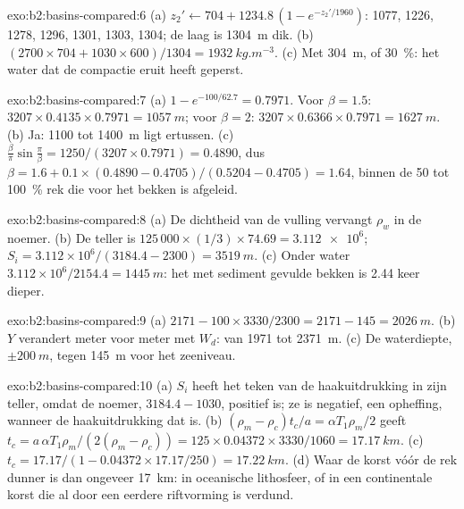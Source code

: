 \begin{solution}{exo:b2:basins-compared:6}
(a) $z_2' \leftarrow 704 + 1234.8\,(1 - e^{-z_2'/1960})$: 1077, 1226, 1278, 1296, 1301, 1303,
1304; de laag is \qty{1304}{m} dik. (b) $(2700\times704 + 1030\times600)/1304 =
\qty{1932}{kg.m^{-3}}$. (c) Met \qty{304}{m}, of \qty{30}{\percent}: het water dat de compactie
eruit heeft geperst.
\end{solution}

\begin{solution}{exo:b2:basins-compared:7}
(a) $1 - e^{-100/62.7} = 0.7971$. Voor $\beta = 1.5$: $3207\times0.4135\times0.7971 =
\qty{1057}{m}$; voor $\beta = 2$: $3207\times0.6366\times0.7971 = \qty{1627}{m}$. (b) Ja: 1100 tot
\qty{1400}{m} ligt ertussen. (c) $\frac{\beta}{\pi}\sin\frac{\pi}{\beta} = 1250/(3207\times0.7971)
= 0.4890$, dus $\beta = 1.6 + 0.1\times(0.4890 - 0.4705)/(0.5204 - 0.4705) = 1.64$, binnen de
50 tot \qty{100}{\percent} rek die voor het bekken is afgeleid.
\end{solution}

\begin{solution}{exo:b2:basins-compared:8}
(a) De dichtheid van de vulling vervangt $\rho_w$ in de noemer. (b) De teller is
$125\,000\times(1/3)\times74.69 = \num{3.112e6}$; $S_i = 3.112\times10^{6}/(3184.4 - 2300) =
\qty{3519}{m}$. (c) Onder water $3.112\times10^{6}/2154.4 = \qty{1445}{m}$: het met sediment gevulde
bekken is 2.44 keer dieper.
\end{solution}

\begin{solution}{exo:b2:basins-compared:9}
(a) $2171 - 100\times3330/2300 = 2171 - 145 = \qty{2026}{m}$. (b) $Y$ verandert meter voor meter
met $W_d$: van 1971 tot \qty{2371}{m}. (c) De waterdiepte, $\pm\qty{200}{m}$, tegen
\qty{145}{m} voor het zeeniveau.
\end{solution}

\begin{solution}{exo:b2:basins-compared:10}
(a) $S_i$ heeft het teken van de haakuitdrukking in zijn teller, omdat de noemer, $3184.4 - 1030$,
positief is; ze is negatief, een opheffing, wanneer de haakuitdrukking dat is. (b) $(\rho_m - \rho_c)t_c/a =
\alpha T_1\rho_m/2$ geeft $t_c = a\,\alpha T_1\rho_m/(2(\rho_m - \rho_c)) = 125\times0.04372\times
3330/1060 = \qty{17.17}{km}$. (c) $t_c = 17.17/(1 - 0.04372\times17.17/250) = \qty{17.22}{km}$.
(d) Waar de korst vóór de rek dunner is dan ongeveer \qty{17}{km}: in oceanische lithosfeer,
of in een continentale korst die al door een eerdere riftvorming is verdund.
\end{solution}

